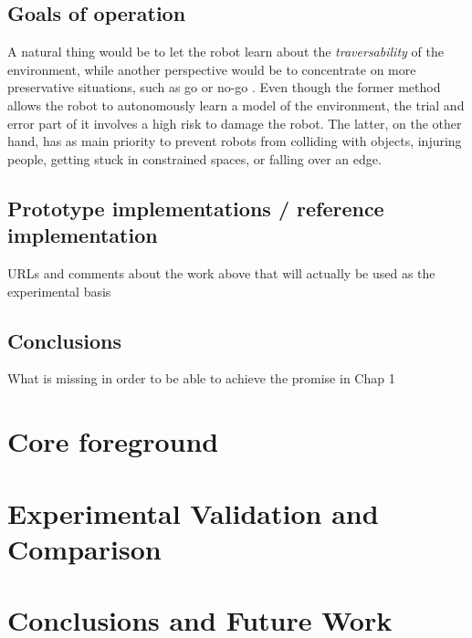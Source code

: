 \documentclass[12pt,a4paper]{report}
\newcommand{\term}{\textit}
\begin{document}
	\section{Goals of operation}
	\label{sec:bg:goals}
	
	A natural thing would be to let the robot learn about the \term{traversability} 
	of the environment, while another perspective would be to concentrate on more 
	preservative situations, such as go or no-go \cite{Hirose}. Even though the 
	former method allows the robot to autonomously learn a model of the environment, 
	the trial and error part of it involves a high risk to damage the robot. The 
	latter, on the other hand, has as main priority to prevent robots from 
	colliding with objects, injuring people, getting stuck in constrained spaces, 
	or falling over an edge.
	\\
	
	\section{Prototype implementations / reference implementation}
	\label{sec:bg:code}
	
	URLs and comments about the work above that will actually be used as 
	the experimental basis
	\\
		
	\section{Conclusions}
	\label{sec:bg:concl}
	
	What is missing in order to be able to achieve the promise in Chap 1
	
	
	\chapter{Core foreground}
	\label{sec:fg}
	
	\chapter{Experimental Validation and Comparison}
	\label{sec:exp}
	
	\chapter{Conclusions and Future Work}
	\label{sec:concl}
	
	\renewcommand{\bibname}{References}
	
	
\end{document}
